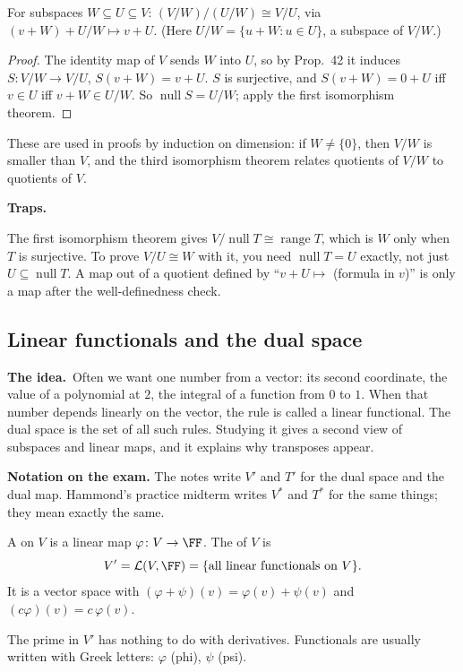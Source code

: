 \documentclass[10pt]{scrartcl}
\DeclareMathOperator{\nul}{null}
\DeclareMathOperator{\range}{range}
\newcommand{\LL}{\mathcal L}
\newcommand{\traps}{\par\medskip\noindent\textbf{\color{RawSienna}Traps.}\ }
\newcommand{\idea}{\par\noindent\textbf{\color{MidnightBlue}The idea.}\ }
\begin{document}
\begin{theorem*}
  For subspaces $W\subseteq U\subseteq V$: $(V/W)/(U/W)\cong V/U$, via $(v+W)+U/W\mapsto v+U$. (Here $U/W=\{u+W:u\in U\}$, a subspace of $V/W$.)
\end{theorem*}
\begin{proof}
  The identity map of $V$ sends $W$ into $U$, so by Prop.~42 it induces $S\colon V/W\to V/U$, $S(v+W)=v+U$. $S$ is surjective, and $S(v+W)=0+U$ iff $v\in U$ iff $v+W\in U/W$. So $\nul S=U/W$; apply the first isomorphism theorem.
\end{proof}
These are used in proofs by induction on dimension: if $W\ne\{0\}$, then $V/W$ is smaller than $V$, and the third isomorphism theorem relates quotients of $V/W$ to quotients of $V$.

\traps
\begin{itemize}
  \ii The first isomorphism theorem gives $V/\nul T\cong\range T$, which is $W$ only when $T$ is surjective.
  \ii To prove $V/U\cong W$ with it, you need $\nul T=U$ exactly, not just $U\subseteq\nul T$.
  \ii A map out of a quotient defined by ``$v+U\mapsto$ (formula in $v$)'' is only a map after the well-definedness check.
\end{itemize}

\subsection{Linear functionals and the dual space}
\idea Often we want one number from a vector: its second coordinate, the value of a polynomial at $2$, the integral of a function from $0$ to $1$. When that number depends linearly on the vector, the rule is called a linear functional. The dual space is the set of all such rules. Studying it gives a second view of subspaces and linear maps, and it explains why transposes appear.

\textbf{Notation on the exam.} The notes write $V'$ and $T'$ for the dual space and the dual map. Hammond's practice midterm writes $V^*$ and $T^*$ for the same things; they mean exactly the same.

\begin{definition*}[Def.~26]
  A  on $V$ is a linear map $\varphi\colon V\to\FF$. The  of $V$ is
  \[ V'=\LL(V,\FF)=\{\text{all linear functionals on }V\}. \]
  It is a vector space with $(\varphi+\psi)(v)=\varphi(v)+\psi(v)$ and $(c\varphi)(v)=c\,\varphi(v)$.
\end{definition*}
The prime in $V'$ has nothing to do with derivatives. Functionals are usually written with Greek letters: $\varphi$ (phi), $\psi$ (psi).
\end{document}
